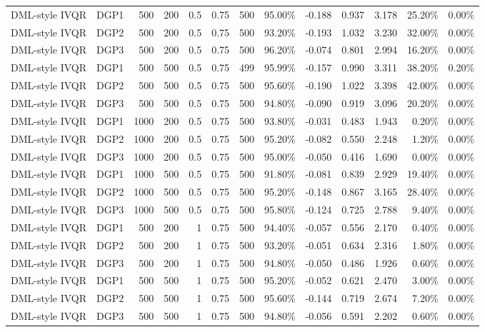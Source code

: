 \begin{landscape}
\begin{longtable}{llrrrrrrrrrrr}
DML-style IVQR & DGP1 & 500 & 200 & 0.5 & 0.75 & 500 & 95.00\% & -0.188 & 0.937 & 3.178 & 25.20\% & 0.00\% \\
DML-style IVQR & DGP2 & 500 & 200 & 0.5 & 0.75 & 500 & 93.20\% & -0.193 & 1.032 & 3.230 & 32.00\% & 0.00\% \\
DML-style IVQR & DGP3 & 500 & 200 & 0.5 & 0.75 & 500 & 96.20\% & -0.074 & 0.801 & 2.994 & 16.20\% & 0.00\% \\
DML-style IVQR & DGP1 & 500 & 500 & 0.5 & 0.75 & 499 & 95.99\% & -0.157 & 0.990 & 3.311 & 38.20\% & 0.20\% \\
DML-style IVQR & DGP2 & 500 & 500 & 0.5 & 0.75 & 500 & 95.60\% & -0.190 & 1.022 & 3.398 & 42.00\% & 0.00\% \\
DML-style IVQR & DGP3 & 500 & 500 & 0.5 & 0.75 & 500 & 94.80\% & -0.090 & 0.919 & 3.096 & 20.20\% & 0.00\% \\
DML-style IVQR & DGP1 & 1000 & 200 & 0.5 & 0.75 & 500 & 93.80\% & -0.031 & 0.483 & 1.943 & 0.20\% & 0.00\% \\
DML-style IVQR & DGP2 & 1000 & 200 & 0.5 & 0.75 & 500 & 95.20\% & -0.082 & 0.550 & 2.248 & 1.20\% & 0.00\% \\
DML-style IVQR & DGP3 & 1000 & 200 & 0.5 & 0.75 & 500 & 95.00\% & -0.050 & 0.416 & 1.690 & 0.00\% & 0.00\% \\
DML-style IVQR & DGP1 & 1000 & 500 & 0.5 & 0.75 & 500 & 91.80\% & -0.081 & 0.839 & 2.929 & 19.40\% & 0.00\% \\
DML-style IVQR & DGP2 & 1000 & 500 & 0.5 & 0.75 & 500 & 95.20\% & -0.148 & 0.867 & 3.165 & 28.40\% & 0.00\% \\
DML-style IVQR & DGP3 & 1000 & 500 & 0.5 & 0.75 & 500 & 95.80\% & -0.124 & 0.725 & 2.788 & 9.40\% & 0.00\% \\
DML-style IVQR & DGP1 & 500 & 200 & 1 & 0.75 & 500 & 94.40\% & -0.057 & 0.556 & 2.170 & 0.40\% & 0.00\% \\
DML-style IVQR & DGP2 & 500 & 200 & 1 & 0.75 & 500 & 93.20\% & -0.051 & 0.634 & 2.316 & 1.80\% & 0.00\% \\
DML-style IVQR & DGP3 & 500 & 200 & 1 & 0.75 & 500 & 94.80\% & -0.050 & 0.486 & 1.926 & 0.60\% & 0.00\% \\
DML-style IVQR & DGP1 & 500 & 500 & 1 & 0.75 & 500 & 95.20\% & -0.052 & 0.621 & 2.470 & 3.00\% & 0.00\% \\
DML-style IVQR & DGP2 & 500 & 500 & 1 & 0.75 & 500 & 95.60\% & -0.144 & 0.719 & 2.674 & 7.20\% & 0.00\% \\
DML-style IVQR & DGP3 & 500 & 500 & 1 & 0.75 & 500 & 94.80\% & -0.056 & 0.591 & 2.202 & 0.60\% & 0.00\% \\

\end{longtable}
\end{landscape}
